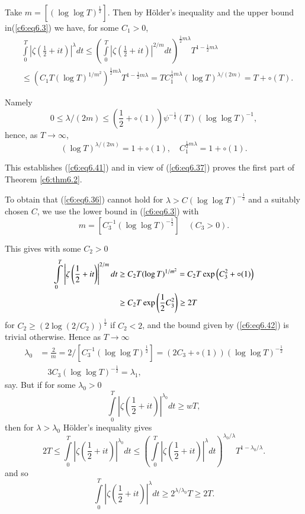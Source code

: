 Take $m = [(\log \log T)^{\frac{1}{2}}]$. Then by H\"older's
inequality and the upper bound in\pageoriginale (\ref{c6:eq6.3}) we
have, for some $C_1 > 0$, 
\begin{align*}
& \int\limits^T_0 \left|\zeta \left(\frac{1}{2} + it
  \right)\right|^\lambda dt \leq \left(\int\limits^T_0 \left|\zeta
  \left(\frac{1}{2} + it \right)\right|^{2/m} dt \right)^{\frac{1}{2}
    m \lambda} T^{1-\frac{1}{2} m\lambda}\\ 
& \leq \left(C_1 T (\log T)^{1/m^2}\right)^{\frac{1}{2} m\lambda}
  T^{1-\frac{1}{2}m\lambda} = TC^{\frac{1}{2} m\lambda}_1 (\log
  T)^{\lambda/(2m)} = T + \circ (T). 
\end{align*}

Namely 
$$
0 \leq \lambda / (2m) \leq \left(\frac{1}{2} + \circ (1) \right)
\psi^{-\frac{1}{2}} (T) (\log \log T)^{-1}, 
$$
hence, as $T \to \infty$,
$$
(\log T)^{\lambda/(2m)} = 1 + \circ (1),\quad C^{\frac{1}{2} m \lambda}_1
= 1+\circ (1). 
$$

This establishes (\ref{c6:eq6.41}) and in view of (\ref{c6:eq6.37})
proves the first part of Theorem \ref{c6:thm6.2}. 

To obtain that (\ref{c6:eq6.36}) cannot hold for $\lambda > C(\log
\log T)^{-\frac{1}{2}}$ and a suitably chosen $C$, we use the lower
bound in (\ref{c6:eq6.3}) with 
$$
m = \left[C^{-1}_3 (\log \log T)^{-\frac{1}{2}}\right] \quad (C_3 > 0 ).
$$

This gives with some $C_2 > 0$
\begin{align}
\int\limits^T_0 \left|\zeta \left(\frac{1}{2} + it
\right)\right|^{2/m} dt & \geq C_2 T (\log T)^{1/m^2} = C_2 T \exp
\left(C^2_3 + \circ (1)\right)\label{c6:eq6.42} \\ 
& \geq C_2 T \exp \left(\frac{1}{2} C^2_3 \right) \geq 2T\notag
\end{align}
for $C_2 \geq (2\log (2/C_2))^{\frac{1}{2}}$ if $C_2 <2 $, and the
bound given by (\ref{c6:eq6.42}) is trivial otherwise. Hence as $T \to
\infty$ 
\begin{align*}
\lambda_0 & = \frac{2}{m} = 2 /\left[C^{-1}_3 (\log \log
  T)^{\frac{1}{2}}\right] = (2C_3 + \circ (1)) (\log \log
T)^{-\frac{1}{2}}\\ 
&  \quad 3 C_3 (\log \log T)^{-\frac{1}{2}} = \lambda_1,
\end{align*}
say. But if for some $\lambda_0 > 0$
$$
\int\limits^T_0 \left|\zeta \left(\frac{1}{2} + it \right)
\right|^{\lambda_0} dt \geq w T,  
$$
then for $\lambda > \lambda_0$ H\"older's inequality gives 
$$
 2T \leq \int\limits^T_0 \left|\zeta \left(\frac{1}{2} + it
 \right)\right|^{\lambda_0} dt \leq \left(\int\limits^T_0 \left|\zeta
 \left(\frac{1}{2} + it \right)\right|^{\lambda} dt
 \right)^{\lambda_0/\lambda} T^{1-\lambda_0/\lambda}. 
$$\pageoriginale
and so
$$
\int\limits^T_0 \left|\zeta \left(\frac{1}{2} + it
\right)\right|^\lambda dt \geq 2^{\lambda/\lambda_0} T \geq 2T. 
$$

